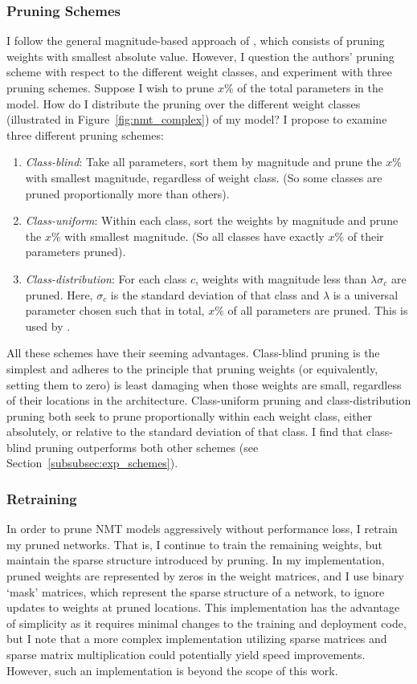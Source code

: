 \subsubsection{Pruning Schemes}
\label{subsubsec:approach_schemes}
I follow the general magnitude-based approach of \cite{han2015learning}, which consists of pruning weights with smallest absolute value. However, I question the authors' pruning scheme with respect to the different weight classes, and experiment with three pruning schemes.
Suppose I wish to prune $x$\% of the total parameters in the model. 
How do I distribute the pruning over the different weight classes (illustrated in Figure~\ref{fig:nmt_complex}) of my model? 
I propose to examine three different pruning schemes:
\begin{enumerate}
\item \textit{Class-blind}: 
Take all parameters, sort them by magnitude and prune the $x$\% with smallest magnitude, regardless of weight class.
(So some classes are pruned proportionally more than others).
\item \textit{Class-uniform}: 
Within each class, sort the weights by magnitude and prune the $x$\% with smallest magnitude.
(So all classes have exactly $x$\% of their parameters pruned).
\item \textit{Class-distribution}: 
 For each class $c$, weights with magnitude less than $\lambda \sigma_c$ are
 pruned. Here, $\sigma_c$ is the standard deviation of that class and $\lambda$ is a universal parameter chosen such that in total, $x\%$ of all parameters are pruned.
This is used by \cite{han2015learning}.
\end{enumerate}
All these schemes have their seeming advantages.
Class-blind pruning is the simplest and adheres to the principle that pruning
weights (or equivalently, setting them to zero) is least damaging when
those weights are small, regardless of their locations in the architecture.
Class-uniform pruning and class-distribution pruning both seek to prune
proportionally within each weight class, either absolutely, or relative to the
standard deviation of that class.
I find that class-blind pruning outperforms both other schemes (see
Section~\ref{subsubsec:exp_schemes}).

\subsubsection{Retraining}
\label{subsubsec:approach_retraining}
In order to prune NMT models aggressively without performance loss, I retrain my pruned networks. 
That is, I continue to train the remaining weights, but maintain the sparse structure introduced by pruning.
In my implementation, pruned weights are represented by zeros in the weight matrices, 
and I use binary `mask' matrices, which represent the sparse structure of a network, 
to ignore updates to weights at pruned locations.
This implementation has the advantage of simplicity as it requires minimal changes to the training and deployment code, 
but I note that a more complex implementation utilizing sparse matrices and sparse matrix multiplication could potentially yield speed improvements.
However, such an implementation is beyond the scope of this work.


